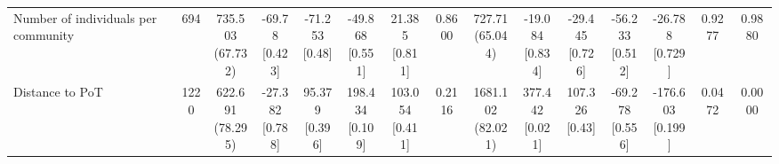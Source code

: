 {\begin{tabular}[t]{lcccccccccccccc}
\hspace{1em}Number of individuals per community & 694 & \makecell[c]{735.503\\(67.732)} & \makecell[c]{-69.78\\{[0.423]}} & \makecell[c]{-71.253\\{[0.48]}} & \makecell[c]{-49.868\\{[0.551]}} & \makecell[c]{21.385\\{[0.811]}} & 0.8600 & \makecell[c]{727.71\\(65.044)} & \makecell[c]{-19.084\\{[0.834]}} & \makecell[c]{-29.445\\{[0.726]}} & \makecell[c]{-56.233\\{[0.512]}} & \makecell[c]{-26.788\\{[0.729]}} & 0.9277 & 0.9880\\
\hspace{1em}Distance to PoT & 1220 & \makecell[c]{622.691\\(78.295)} & \makecell[c]{-27.382\\{[0.788]}} & \makecell[c]{95.379\\{[0.396]}} & \makecell[c]{198.434\\{[0.109]}} & \makecell[c]{103.054\\{[0.411]}} & 0.2116 & \makecell[c]{1681.102\\(82.021)} & \makecell[c]{377.442\\{[0.021]}} & \makecell[c]{107.326\\{[0.43]}} & \makecell[c]{-69.278\\{[0.556]}} & \makecell[c]{-176.603\\{[0.199]}} & 0.0472 & 0.0000\\
\bottomrule
\end{tabular}}

